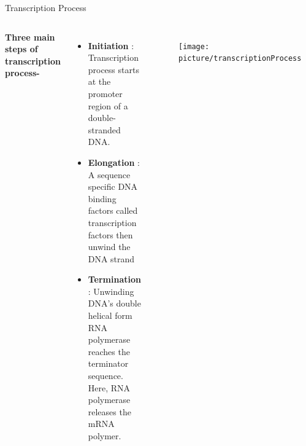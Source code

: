 \documentclass[serif,mathserif,final]{beamer}
\begin{document}
\begin{frame}{}
\begin{columns}[t]
\begin{column}{0.24\linewidth}
      
    \end{column}%


    
    \begin{column}{0.24\linewidth}

      \begin{block}{Transcription Process}
      
	  \begin{columns}[c] %

	  \textbf{Three main steps of transcription process-}
	  \begin{itemize}
	  \item {\bf Initiation} : Transcription process starts at the promoter region of a double-stranded DNA. 
	  \item {\bf Elongation} : A sequence specific DNA binding factors called transcription factors then unwind the DNA strand
	  \item {\bf Termination} : Unwinding DNA's double helical form RNA polymerase reaches the terminator sequence. Here, RNA polymerase releases the mRNA polymer.
	  \end{itemize}


	  \begin{figure}[!htb]
	  \centering
	  \texttt{[image: picture/transcriptionProcess.png]}
	  \label{fig:transcriptionProcess}
	  \end{figure}

	  \end{columns}
     
      \end{block}


\end{column}
\end{columns}
\end{frame}
\end{document}
